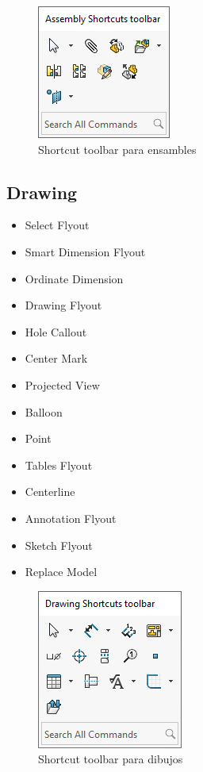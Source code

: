 \documentclass[12pt,letterpaper,final]{report}
\begin{document}
\begin{figure}[H]
	\centering
	\includegraphics[width=0.35\linewidth, height=0.4\textheight,keepaspectratio]{Imagenes/solidworks_shortcutbars_04}
	\caption{Shortcut toolbar para ensambles}
	\label{fig:solidworksshortcutbars04}
\end{figure}

\subsection{Drawing}

\begin{itemize}
	\item Select Flyout
	\item Smart Dimension Flyout
	\item Ordinate Dimension
	\item Drawing Flyout
	\item Hole Callout
	\item Center Mark
	\item Projected View
	\item Balloon
	\item Point
	\item Tables Flyout
	\item Centerline
	\item Annotation Flyout
	\item Sketch Flyout
	\item Replace Model

\end{itemize}

\begin{figure}[H]
	\centering
	\includegraphics[width=0.45\linewidth, height=0.45\textheight,keepaspectratio]{Imagenes/solidworks_shortcutbars_05}
	\caption{Shortcut toolbar para dibujos}
	\label{fig:solidworksshortcutbars05}
\end{figure}
\end{document}
